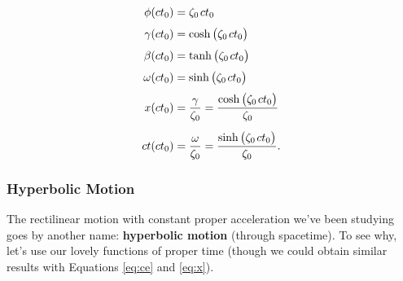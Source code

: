 \documentclass[12pt]{article}
\begin{document}
\begin{equation*}
\begin{aligned}
\phi (ct_0) &= \zeta_0 \mkern2mu ct_0 \\[3pt]
\gamma (ct_0) &= \cosh \big( \zeta_0 \mkern2mu ct_0 \big) \\[3pt]
\beta (ct_0) &= \tanh \big( \zeta_0 \mkern2mu ct_0 \big) \\[3pt]
\omega (ct_0) &= \sinh \big( \zeta_0 \mkern2mu ct_0 \big) \\[3pt]
x(ct_0) &= \dfrac{\gamma}{ \zeta_0 } = \dfrac{\cosh \big( \zeta_0 \mkern2mu ct_0 \big)}{ \zeta_0 } \\[5pt]
ct(ct_0) &= \dfrac{\omega}{ \zeta_0} = \dfrac{\sinh \big( \zeta_0 \mkern2mu ct_0 \big)}{ \zeta_0 }.
\end{aligned}
\end{equation*}



\subsubsection{Hyperbolic Motion}

The rectilinear motion with constant proper acceleration we've been studying goes by another name: \textbf{hyperbolic motion} (through spacetime). To see why, let's use our lovely functions of proper time (though we could obtain similar results with Equations \ref{eq:ce} and \ref{eq:x}).
\end{document}
